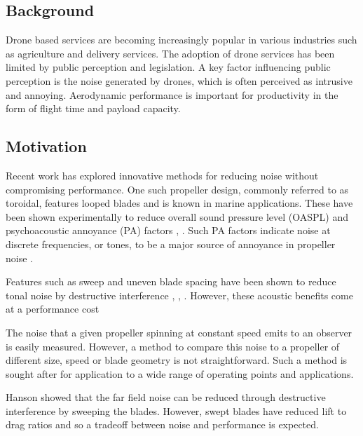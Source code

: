 \documentclass[12pt,a4paper]{article}
\begin{document}
\subsection{Background}

Drone based services are becoming increasingly popular in various industries such as agriculture and delivery services.
The adoption of drone services has been limited by public perception and legislation.
A key factor influencing public perception is the noise generated by drones, which is often perceived as intrusive and annoying.
Aerodynamic performance is important for productivity in the form of flight time and payload capacity.

\subsection{Motivation}

Recent work has explored innovative methods for reducing noise without compromising performance.
One such propeller design, commonly referred to as toroidal, features looped blades and is known in marine applications.
These have been shown experimentally to reduce overall sound pressure level (OASPL) and psychoacoustic annoyance (PA) factors \cite{shima_toroidal}, \cite{ijerph20031955}.
Such PA factors indicate noise at discrete frequencies, or tones, to be a major source of annoyance in propeller noise \cite{ijerph20031955}. %

Features such as sweep and uneven blade spacing have been shown to reduce tonal noise by destructive interference \cite{hanson_influence}, \cite{DOBRZYNSKI1993123}, \cite{doi:10.2514/3.22938} \cite{Wiedemann_swept}.
However, these acoustic benefits come at a performance cost 

The noise that a given propeller spinning at constant speed emits to an observer is easily measured.
However, a method to compare this noise to a propeller of different size, speed or blade geometry is not straightforward.
Such a method is sought after for application to a wide range of operating points and applications.

Hanson \cite{hanson_influence} showed that the far field noise can be reduced through destructive interference by sweeping the blades.
However, swept blades have reduced lift to drag ratios \cite{bergmann_sweep} and so a tradeoff between noise and performance is expected.
\end{document}
